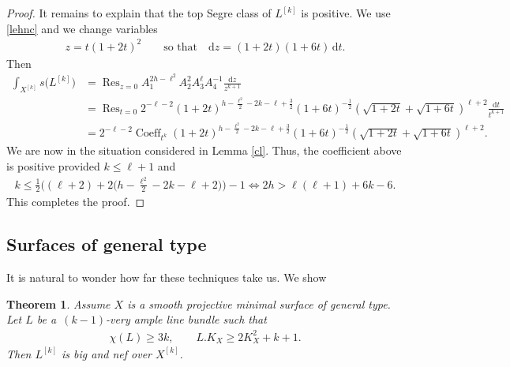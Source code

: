 \documentclass[10pt,a4paper]{amsart}
\numberwithin{equation}{section}
\newtheorem{Theorem}{Theorem}[section]
\begin{document}
\begin{proof}
It remains to explain that the top Segre class of $L^{[k]}$ is positive. We use \eqref{lehnc} and we change variables
\begin{gather*}
z=t(1+2t)^2\qquad \text{so that}\quad \mathrm dz=(1+2t)(1+6t)\,{\mathrm dt}.
\end{gather*}
Then
\begin{align}
\int_{X^{[k]}} s\big(L^{[k]}\big)&=\operatorname{Res}_{z=0} A_1^{2h-\ell^2} A_2^2 A_3^{\ell} A_4^{-1} \frac{\mathrm dz}{z^{k+1}}\nonumber
\\
\nonumber&=
\operatorname{Res}_{t=0} 2^{-\ell-2} (1+2t)^{h-\frac{\ell^2}{2}-2k-\ell+\frac{3}{2}} (1+6t)^{-\frac{1}{2}} \left(\sqrt{1+2t}+\sqrt{1+6t}\right)^{\ell+2}\frac{\mathrm dt}{t^{k+1}}
\\
&= 2^{-\ell-2} \operatorname{Coeff}_{t^k} (1\!+2t)^{h-\frac{\ell^2}{2}-2k-\ell+\frac{3}{2}} (1\!+6t)^{-\frac{1}{2}} \left(\sqrt{1+2t}\!+\sqrt{1+6t}\right)^{\ell+2}\!.
\label{cvvv}
\end{align}
We are now in the situation considered in Lemma \ref{cl}. Thus, the coefficient above is positive provided $k\leq \ell+1$ and
\begin{gather*}
k\leq \frac{1}{2} \bigg((\ell+2)+2\bigg(h-\frac{\ell^2}{2}-2k-\ell+2\bigg)\bigg)-1\iff 2h> \ell(\ell+1)+6k-6.
\end{gather*}
This completes the proof.
\end{proof}

\subsection{Surfaces of general type} It is natural to wonder how far these techniques take us. We show

\begin{Theorem} \label{gtyp}Assume $X$ is a smooth projective minimal surface of general type. Let $L$ be a~$(k-1)$-very ample line bundle such that
\begin{gather*}
\chi(L)\geq 3k, \qquad L.K_X\geq 2K_X^2+k+1.
\end{gather*}
Then $L^{[k]}$ is big and nef over $X^{[k]}$.
\end{Theorem}
\end{document}
